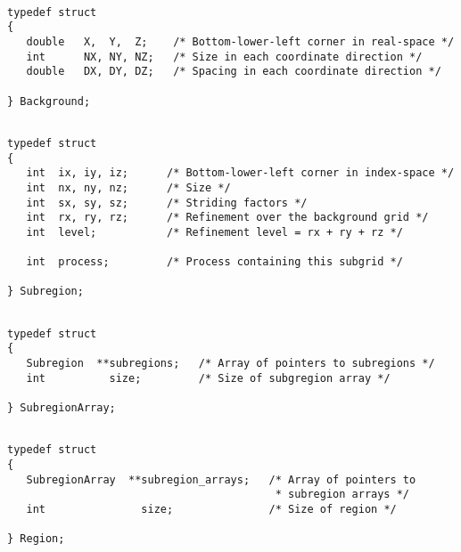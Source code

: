 {\newpage\clearpage
{}%
\begin{display}\begin{verbatim}

typedef struct
{
   double   X,  Y,  Z;    /* Bottom-lower-left corner in real-space */
   int      NX, NY, NZ;   /* Size in each coordinate direction */
   double   DX, DY, DZ;   /* Spacing in each coordinate direction */

} Background;\end{verbatim}
\end{display}%
\lthtmlfigureZ
\lthtmlcheckvsize\clearpage}

{\newpage\clearpage
{}%
\begin{display}\begin{verbatim}

typedef struct
{
   int  ix, iy, iz;      /* Bottom-lower-left corner in index-space */
   int  nx, ny, nz;      /* Size */
   int  sx, sy, sz;      /* Striding factors */
   int  rx, ry, rz;      /* Refinement over the background grid */
   int  level;           /* Refinement level = rx + ry + rz */

   int  process;         /* Process containing this subgrid */

} Subregion;\end{verbatim}
\end{display}%
\lthtmlfigureZ
\lthtmlcheckvsize\clearpage}

{\newpage\clearpage
{}%
\begin{display}\begin{verbatim}

typedef struct
{
   Subregion  **subregions;   /* Array of pointers to subregions */
   int          size;         /* Size of subgregion array */

} SubregionArray;\end{verbatim}
\end{display}%
\lthtmlfigureZ
\lthtmlcheckvsize\clearpage}

{\newpage\clearpage
{}%
\begin{display}\begin{verbatim}

typedef struct
{
   SubregionArray  **subregion_arrays;   /* Array of pointers to
                                          * subregion arrays */
   int               size;               /* Size of region */

} Region;\end{verbatim}
\end{display}%
\lthtmlfigureZ
\lthtmlcheckvsize\clearpage}

